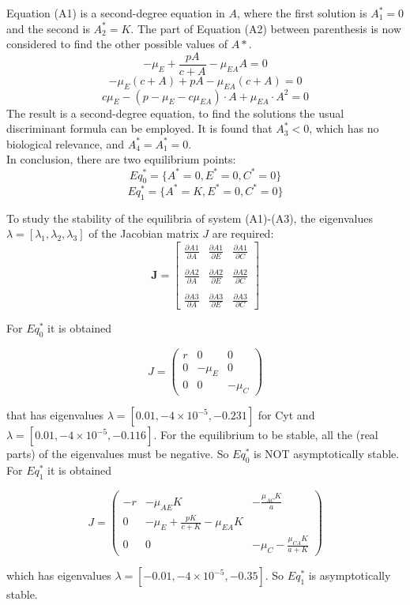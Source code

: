 Equation (A1) is a second-degree equation in $A$, where the first solution is $A^*_1=0$ and the second is $A^*_2=K$. The part of Equation (A2) between parenthesis is now considered to find the other possible values of $A*$.
\[ -\mu_E + \frac{pA}{c+A} - \mu_{EA}A = 0 \]
\[ -\mu_E(c+A) + pA - \mu_{EA}(c+A) = 0\]
\[c\mu_E - (p -\mu_E - c\mu_{EA})\cdot A + \mu_{EA}\cdot A^2 = 0\]
The result is a second-degree equation, to find the solutions the usual discriminant formula can be employed. It is found that $A^*_3 < 0$, which has no biological relevance, and $A^*_4 = A^*_1 = 0$.\\
In conclusion, there are two equilibrium points: 
\[Eq_0^* = \{A^* = 0, E^* = 0, C^* = 0\}\]
\[Eq_1^* = \{A^* = K, E^* = 0, C^* = 0\}\]

To study the stability of the equilibria of system (A1)-(A3), the eigenvalues $\lambda = [\lambda_1,\lambda_2,\lambda_3]$ of the Jacobian matrix $J$ are required:
\[ \mathbf{J} = \begin{bmatrix} \frac{\partial A1}{\partial A} & \frac{\partial A1}{\partial E} & \frac{\partial A1}{\partial C} \\ \\
\frac{\partial A2}{\partial A} & \frac{\partial A2}{\partial E} & \frac{\partial A2}{\partial C}\\ \\
\frac{\partial A3}{\partial A} & \frac{\partial A3}{\partial E} & \frac{\partial A3}{\partial C} \end{bmatrix} \]

For $Eq_0^*$ it is obtained

\[ J = \begin{pmatrix} r&0&0 \\ 0&-\mu_E&0 \\ 0&0&-\mu_C \end{pmatrix} \]

that has eigenvalues $\lambda = [0.01,-4\times 10^{-5},-0.231]$ for Cyt and $\lambda = [0.01,-4\times 10^{-5},-0.116]$. For the equilibrium to be stable, all the (real parts) of the eigenvalues must be negative. So $Eq_0^*$ is NOT asymptotically stable.\\

For $Eq_1^*$ it is obtained

\[ J = \begin{pmatrix} -r & -\mu_{AE}K & -\frac{\mu_{AC}K}{a} \\ 0 & -\mu_E + \frac{pK}{c+K} - \mu_{EA}K \\ 0&0& -\mu_C - \frac{\mu_{CA}K}{a+K} \end{pmatrix} \]

which has eigenvalues $\lambda = [-0.01, -4\times 10^{-5}, -0.35]$. So $Eq_1^*$ is asymptotically stable.
